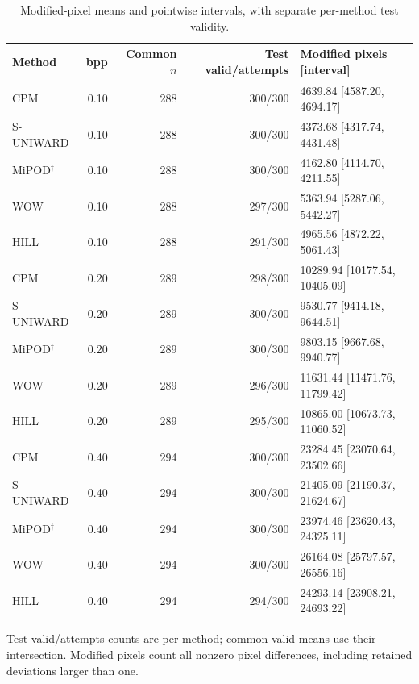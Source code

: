 \documentclass[journal]{IEEEtran}
\renewcommand{\arraystretch}{1.2}
\renewcommand{\arraystretch}{1.0}
\theoremstyle{definition}
\theoremstyle{game}
\renewcommand{\arraystretch}{1.5}
\begin{document}
\begin{table}[!t]
\centering\footnotesize
\caption{Modified-pixel means and pointwise intervals, with separate per-method test validity.}
\label{tab:hsm-modifications}
\setlength{\tabcolsep}{4pt}\renewcommand{\arraystretch}{1.15}
\begin{tabular}{lrrrl}
\toprule
Method & bpp & Common $n$ & Test valid/attempts & Modified pixels [interval]\\
\midrule
CPM & 0.10 & 288 & 300/300 & 4639.84 [4587.20, 4694.17]\\
S-UNIWARD & 0.10 & 288 & 300/300 & 4373.68 [4317.74, 4431.48]\\
MiPOD$^\dagger$ & 0.10 & 288 & 300/300 & 4162.80 [4114.70, 4211.55]\\
WOW & 0.10 & 288 & 297/300 & 5363.94 [5287.06, 5442.27]\\
HILL & 0.10 & 288 & 291/300 & 4965.56 [4872.22, 5061.43]\\
CPM & 0.20 & 289 & 298/300 & 10289.94 [10177.54, 10405.09]\\
S-UNIWARD & 0.20 & 289 & 300/300 & 9530.77 [9414.18, 9644.51]\\
MiPOD$^\dagger$ & 0.20 & 289 & 300/300 & 9803.15 [9667.68, 9940.77]\\
WOW & 0.20 & 289 & 296/300 & 11631.44 [11471.76, 11799.42]\\
HILL & 0.20 & 289 & 295/300 & 10865.00 [10673.73, 11060.52]\\
CPM & 0.40 & 294 & 300/300 & 23284.45 [23070.64, 23502.66]\\
S-UNIWARD & 0.40 & 294 & 300/300 & 21405.09 [21190.37, 21624.67]\\
MiPOD$^\dagger$ & 0.40 & 294 & 300/300 & 23974.46 [23620.43, 24325.11]\\
WOW & 0.40 & 294 & 300/300 & 26164.08 [25797.57, 26556.16]\\
HILL & 0.40 & 294 & 294/300 & 24293.14 [23908.21, 24693.22]\\
\bottomrule
\end{tabular}
\par\smallskip\parbox{.97\textwidth}{\footnotesize Test valid/attempts counts are per method; common-valid means use their intersection. Modified pixels count all nonzero pixel differences, including retained deviations larger than one.}
\end{table}
\end{document}
